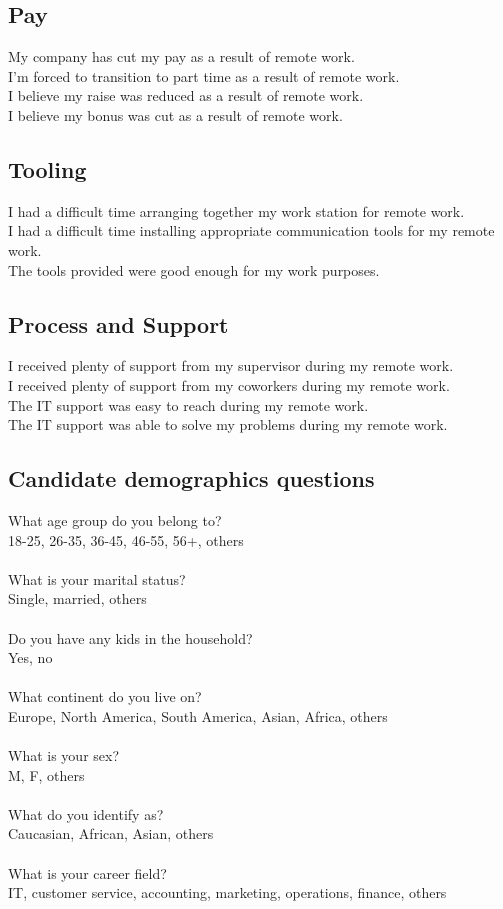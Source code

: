 \documentclass[12pt]{article}
\begin{document}
\subsection*{Pay}

My company has cut my pay as a result of remote work. \\
I’m forced to transition to part time as a result of remote work. \\
I believe my raise was reduced as a result of remote work. \\
I believe my bonus was cut as a result of remote work. 

\subsection*{Tooling} 

I had a difficult time arranging together my work station for remote work.  \\
I had a difficult time installing appropriate communication tools for my remote work.  \\
The tools  provided were good enough for my work purposes. 

\subsection*{Process and Support}

I received plenty of support from my supervisor during my remote work. \\
I received plenty of support from my coworkers during my remote work. \\
The IT support was easy to reach during my remote work. \\
The IT support was able to solve my problems during my remote work.


\subsection*{Candidate demographics questions}

What age group do you belong to? \\
18-25, 26-35, 36-45, 46-55, 56+, others \\ \\
What is your marital status? \\
Single, married, others \\ \\
Do you have any kids in the household? \\
Yes, no \\ \\
What continent do you live on? \\
Europe, North America, South America, Asian, Africa, others \\ \\
What is your sex? \\
M, F, others \\ \\
What do you identify as? \\
Caucasian, African, Asian, others \\ \\
What is your career field? \\
IT, customer service, accounting, marketing, operations, finance, others 
\end{document}
